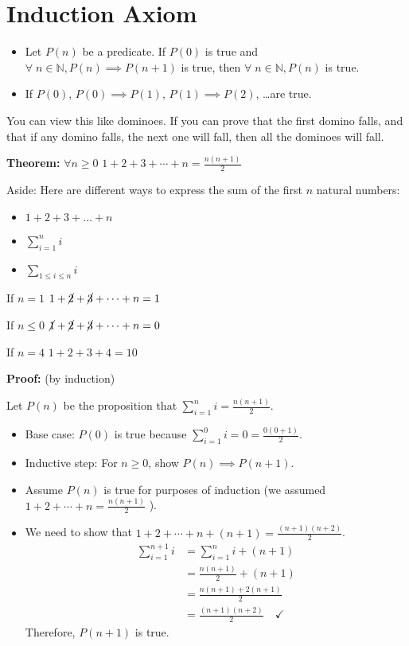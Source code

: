 \documentclass[11pt]{article}
\theoremstyle{definition}
\begin{document}
\section{Induction Axiom}
\begin{itemize}
        \item Let \( P(n) \) be a predicate. If \( P(0) \) is true and \( \forall \; n \in \mathbb{N}, P(n) \implies P(n+1) \) is true, then \( \forall \; n \in \mathbb{N}, P(n) \) is true.
        \item If \( P(0) \), \( P(0) \implies P(1) \), \( P(1) \implies P(2) \), \ldots are true.
\end{itemize}

You can view this like dominoes. If you can prove that the first domino falls, and that if any domino falls, the next one will fall, then all the dominoes will fall.

\textbf{Theorem:} \( \forall n \geq 0 \) \( 1 + 2 + 3 + \cdots + n = \frac{n(n+1)}{2} \)

Aside: Here are different ways to express the sum of the first \( n \) natural numbers:
\begin{itemize}
         \item \( 1 + 2 + 3 + \ldots + n \)
         \item \( \sum_{i=1}^{n} i \)
         \item \( \sum_{1 \leq i \leq n} i \)
\end{itemize}

If \( n=1 \)
\hspace*{1cm}
\( 1 + \cancel{2} + \cancel{3} + \cdots + n = 1 \)

If \( n \leq 0 \)
\hspace*{1cm}
\( \cancel{1} + \cancel{2} + \cancel{3} + \cdots + n = 0 \)

If \( n = 4 \)
\hspace*{1cm}
\( 1 + 2 + 3 + 4 = 10 \)

\textbf{Proof:} (by induction)

Let \( P(n) \) be the proposition that \( \sum_{i=1}^{n} i = \frac{n(n+1)}{2} \).

\begin{itemize}
        \item Base case: \( P(0) \) is true because \( \sum_{i=1}^{0} i = 0 = \frac{0(0+1)}{2} \).
        \item Inductive step: For \( n \geq 0 \), show \( P(n) \implies P(n+1) \).
        \item Assume \( P(n) \) is true for purposes of induction (we assumed \( 1 + 2 + \cdots + n = \frac{n(n+1)}{2} \) ).
        \item We need to show that \( 1+2+\cdots+n+(n+1) = \frac{(n+1)(n+2)}{2} \).
        \begin{align*}
                \sum_{i=1}^{n+1} i &= \sum_{i=1}^{n} i + (n+1) \\
                &= \frac{n(n+1)}{2} + (n+1) \\
                &= \frac{n(n+1) + 2(n+1)}{2} \\
                &= \frac{(n+1)(n+2)}{2} \quad \checkmark
        \end{align*}
        Therefore, \( P(n+1) \) is true.\ 
\end{itemize}
\end{document}
